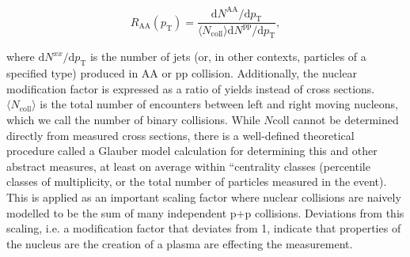  \begin{equation}
    R_\mathrm{AA}(p_\mathrm{T}) = \frac{\mathrm{d}N^\mathrm{AA}/\mathrm{d}p_\mathrm{T}}{\langle N_\mathrm{coll}\rangle\mathrm{d}N^\mathrm{pp}/\mathrm{d}p_\mathrm{T}},
    \label{eq:raa}
  \end{equation}

  where $\mathrm{d}N^{xx}/\mathrm{d}p_\mathrm{T}$ is the number of jets (or, in other contexts, particles of a specified type) produced in AA or pp collision. Additionally, the nuclear modification factor is expressed as a ratio of yields instead of cross sections. $\langle N_\mathrm{coll}\rangle$ is the total number of encounters between left and right moving nucleons, which we call the number of binary collisions. While $N\mathrm{coll}$ cannot be determined directly from measured cross sections, there is a well-defined theoretical procedure called a Glauber model calculation \cite{doi:10.1146/annurev.nucl.57.090506.123020} for determining this and other abstract measures, at least on average within “centrality classes (percentile classes of multiplicity, or the total number of particles measured in the event). This is applied as an important scaling factor where nuclear collisions are naively modelled to be the sum of many independent p+p collisions. Deviations from this scaling, i.e. a modification factor that deviates from 1, indicate that properties of the nucleus are the creation of a plasma are effecting the measurement.

